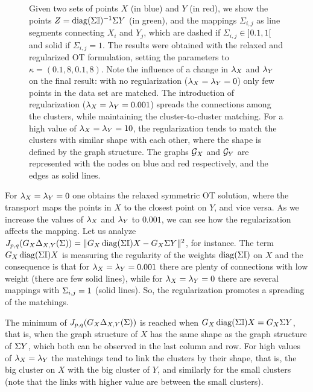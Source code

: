 \begin{figure}
\begin{tabular}{@{}|@{}c@{}|@{}c@{}|@{}}
\end{tabular}
\caption{Given two sets of points $X$ (in blue) and $Y$ (in red), we show the points $Z=\diag(\Sigma \U)^{-1} \Sigma Y$ (in green), and the mappings $\Sigma_{i,j}$ as line segments connecting $X_i$ and $Y_j$, which are dashed if $\Sigma_{i,j} \in ]0.1,1[$  and solid if $\Sigma_{i,j}=1$. The results were obtained with the relaxed and regularized OT formulation, setting the parameters to $\kappa=(0.1,8,0.1,8)$. Note the influence of a change in $\lambda_X$ and $\lambda_Y$ on the final result: with no regularization ($\lambda_X=\lambda_Y=0$) only few points in the data set are matched. The introduction of regularization ($\lambda_X=\lambda_Y=0.001$) spreads the connections among the clusters, while maintaining the cluster-to-cluster matching. For  a high value of $\lambda_X=\lambda_Y=10$, the regularization tends to match the clusters with similar shape with each other, where the shape is defined by the graph structure. The graphs $\mathcal{G}_X$ and $\mathcal{G}_Y$ are represented with the nodes on blue and red respectively, and the edges as solid lines.}\label{exlk}
\end{figure}

For $\lambda_X=\lambda_Y=0$ one obtains the relaxed symmetric OT solution, where the transport maps the points in $X$ to the closest point on $Y$, and vice versa. As we increase the values of $\lambda_X$ and $\lambda_Y$ to $0.001$, we can see how the regularization affects the mapping. Let us analyze $\regul{G_X \De_{X,Y}(\Sig)} = \|G_X \diag(\Sig \U) X - G_X \Sig Y\|^2 $, for instance. The  term $G_X \diag(\Sig \U) X$ is measuring the regularity of the weights $\diag(\Sig \U)$ on $X$ and the consequence is that for $\lambda_X=\lambda_Y=0.001$ there are 
plenty of connections with low weight (there are few solid lines), while for $\lambda_X=\lambda_Y=0$ there are several mappings with $\Sigma_{i,j} = 1$ (solid lines). So, the regularization promotes a spreading of the matchings. 

The minimum of $J_{p,q}(G_X \Delta_{X,Y}(\Sigma))$ is reached when $G_X \diag(\Sig \U) X = G_X \Sig Y$, that is, when the graph structure of $X$ has the same shape as the graph structure of $\Sigma Y$, which both can be observed in the last column and row. For high values of $\lambda_X=\lambda_Y$ the matchings tend to link the clusters by their shape, that is, the big cluster on $X$ with the big cluster of $Y$, and similarly for the small clusters (note that the links with higher value are between the small clusters). 


